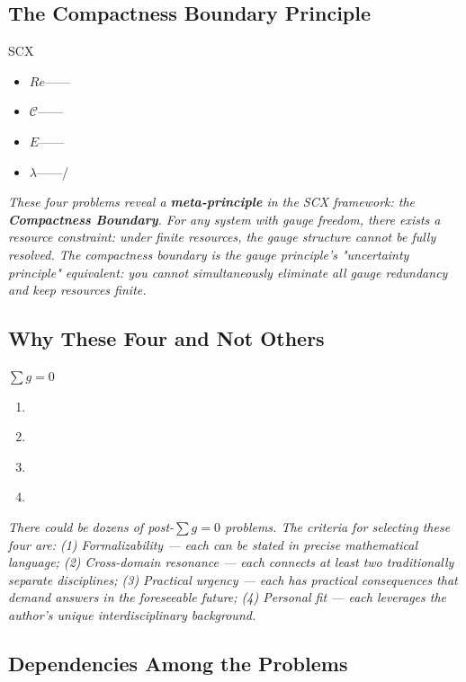 \documentclass[12pt,a4paper]{article}
\theoremstyle{remark}
\begin{document}
\subsection{ The Compactness Boundary Principle}

SCX\textbf{}\textbf{}\textit{}
\begin{itemize}
    \item $Re$——
    \item $\mathcal{C}$——
    \item $E$——
    \item $\lambda$——/
\end{itemize}

\"\"\textit{}

\medskip
\noindent\textit{These four problems reveal a \textbf{meta-principle} in the SCX framework: the \textbf{Compactness Boundary}. For any system with gauge freedom, there exists a resource constraint: \textit{under finite resources, the gauge structure cannot be fully resolved.} The compactness boundary is the gauge principle's "uncertainty principle" equivalent: you cannot simultaneously eliminate all gauge redundancy \textit{and} keep resources finite.}

\subsection{ Why These Four and Not Others}

$\sum g = 0$
\begin{enumerate}[label=(\arabic*)]
    \item \textbf{}
    \item \textbf{}
    \item \textbf{}
    \item \textbf{}
\end{enumerate}

\medskip
\noindent\textit{There could be dozens of post-$\sum g = 0$ problems. The criteria for selecting these four are: (1) Formalizability — each can be stated in precise mathematical language; (2) Cross-domain resonance — each connects at least two traditionally separate disciplines; (3) Practical urgency — each has practical consequences that demand answers in the foreseeable future; (4) Personal fit — each leverages the author's unique interdisciplinary background.}

\subsection{ Dependencies Among the Problems}
\end{document}
